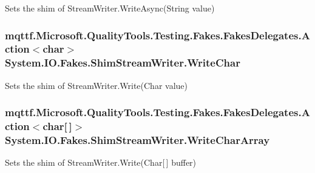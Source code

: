 Sets the shim of Stream\-Writer.\-Write\-Async(\-String value)

\hypertarget{class_system_1_1_i_o_1_1_fakes_1_1_shim_stream_writer_a9caf8412e8826453e1b286dce20da723}{
\subsubsection[{Write\-Char}]{\setlength{\rightskip}{0pt plus 5cm}mqttf.\-Microsoft.\-Quality\-Tools.\-Testing.\-Fakes.\-Fakes\-Delegates.\-Action$<$char$>$ System.\-I\-O.\-Fakes.\-Shim\-Stream\-Writer.\-Write\-Char\hspace{0.3cm}{\ttfamily [set]}}}\label{class_system_1_1_i_o_1_1_fakes_1_1_shim_stream_writer_a9caf8412e8826453e1b286dce20da723}


Sets the shim of Stream\-Writer.\-Write(\-Char value)

\hypertarget{class_system_1_1_i_o_1_1_fakes_1_1_shim_stream_writer_a63d89c0c6e0b747d06bb2c35239e118e}{
\subsubsection[{Write\-Char\-Array}]{\setlength{\rightskip}{0pt plus 5cm}mqttf.\-Microsoft.\-Quality\-Tools.\-Testing.\-Fakes.\-Fakes\-Delegates.\-Action$<$char\mbox{[}$\,$\mbox{]}$>$ System.\-I\-O.\-Fakes.\-Shim\-Stream\-Writer.\-Write\-Char\-Array\hspace{0.3cm}{\ttfamily [set]}}}\label{class_system_1_1_i_o_1_1_fakes_1_1_shim_stream_writer_a63d89c0c6e0b747d06bb2c35239e118e}


Sets the shim of Stream\-Writer.\-Write(\-Char\mbox{[}$\,$\mbox{]} buffer)

